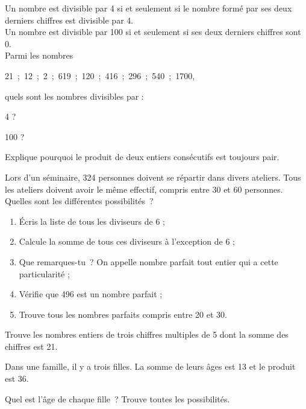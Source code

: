 \begin{exercice}
Un nombre est divisible par 4 si et seulement si le nombre formé par ses deux derniers chiffres est divisible par 4.\\[0.5em]
Un nombre est divisible par 100 si et seulement si ses deux derniers chiffres sont 0.\\[0.5em]
Parmi les nombres

21 ; 12 ; 2 ; 619 ; 120 ; 416 ; 296 ; 540 ; 1700,

quels sont les nombres divisibles par :
\begin{colenumerate}{2}
 \item 4 ?
 \item 100 ?
 \end{colenumerate}
\end{exercice}


\begin{exercice}[Pair]
Explique pourquoi le produit de deux entiers consécutifs est toujours pair.
\end{exercice}


\begin{exercice}[Séminaire]
Lors d'un séminaire, 324 personnes doivent se répartir dans divers ateliers. Tous les ateliers doivent avoir le même effectif, compris entre 30 et 60 personnes. Quelles sont les différentes possibilités ?
\end{exercice}


\begin{exercice}
\begin{enumerate}
 \item Écris la liste de tous les diviseurs de 6 ;
 \item Calcule la somme de tous ces diviseurs à l'exception de 6 ;
 \item Que remarques-tu ? On appelle nombre parfait tout entier qui a cette particularité ;
 \item Vérifie que 496 est un nombre parfait ;
 \item Trouve tous les nombres parfaits compris entre 20 et 30.
 \end{enumerate}
\end{exercice}


\begin{exercice}
Trouve les nombres entiers de trois chiffres multiples de 5 dont la somme des chiffres est 21.
\end{exercice}


\begin{exercice}
Dans une famille, il y a trois filles. La somme de leurs âges est 13 et le produit est 36.

Quel est l'âge de chaque fille ? Trouve toutes les possibilités.
\end{exercice}


